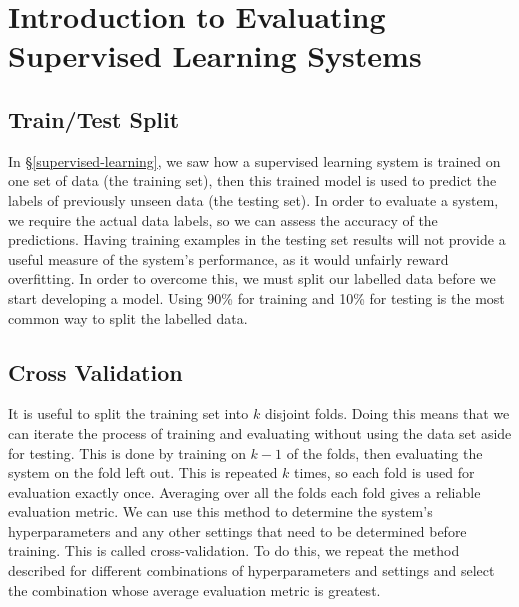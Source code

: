 \documentclass[12pt,a4paper,twoside,openright]{report}
\begin{document}
\section{Introduction to Evaluating Supervised Learning Systems} \label{intro-to-evaluating}
\subsection{Train/Test Split} \label{train-test-split}
In \S\ref{supervised-learning}, we saw how a supervised learning system is trained on one set of data (the training set), then this trained model is used to predict the labels of previously unseen data (the testing set). In order to evaluate a system, we require the actual data labels, so we can assess the accuracy of the predictions. Having training examples in the testing set results will not provide a useful measure of the system's performance, as it would unfairly reward overfitting. In order to overcome this, we must split our labelled data before we start developing a model. Using 90\% for training and 10\% for testing is the most common way to split the labelled data.
\subsection{Cross Validation} \label{cross-validation}
It is useful to split the training set into $k$ disjoint folds. Doing this means that we can iterate the process of training and evaluating without using the data set aside for testing. This is done by training on $k-1$ of the folds, then evaluating the system on the fold left out. This is repeated $k$ times, so each fold is used for evaluation exactly once. Averaging over all the folds each fold gives a reliable evaluation metric. We can use this method to determine the system's hyperparameters and any other settings that need to be determined before training. This is called cross-validation. To do this, we repeat the method described for different combinations of hyperparameters and settings and select the combination whose average evaluation metric is greatest.
\end{document}
